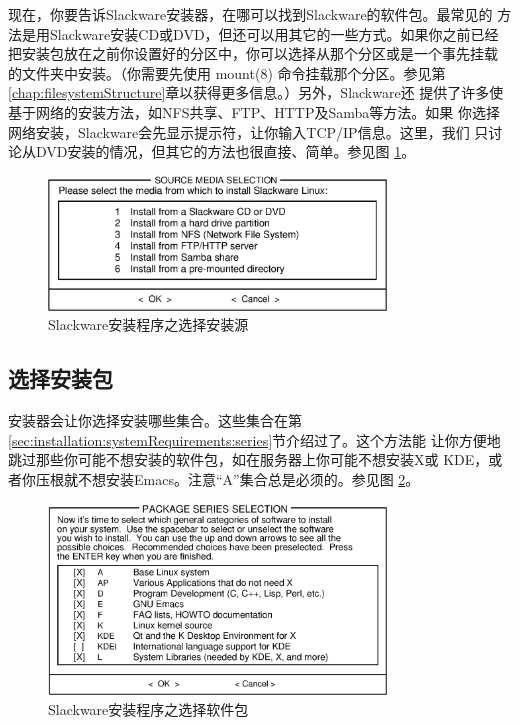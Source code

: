 现在，你要告诉Slackware安装器，在哪可以找到Slackware的软件包。最常见的
方法是用Slackware安装CD或DVD，但还可以用其它的一些方式。如果你之前已经
把安装包放在之前你设置好的分区中，你可以选择从那个分区或是一个事先挂载
的文件夹中安装。（你需要先使用 mount(8) 命令挂载那个分区。参见第
\ref{chap:filesystemStructure}章以获得更多信息。）另外，Slackware还
提供了许多使基于网络的安装方法，如NFS共享、FTP、HTTP及Samba等方法。如果
你选择网络安装，Slackware会先显示提示符，让你输入TCP/IP信息。这里，我们
只讨论从DVD安装的情况，但其它的方法也很直接、简单。参见图
\ref{fig:setup-source}。
\begin{figure}[htbf]
  \centering
  \includegraphics[width=0.8\textwidth]{images/installation/setup-source.eps}
  \caption{Slackware安装程序之选择安装源}
  \label{fig:setup-source}
\end{figure}

\subsection{选择安装包}
\label{sec:installation:setup:select}

安装器会让你选择安装哪些集合。这些集合在第
\ref{sec:installation:systemRequirements:series}节介绍过了。这个方法能
让你方便地跳过那些你可能不想安装的软件包，如在服务器上你可能不想安装X或
KDE，或者你压根就不想安装Emacs。注意``A''集合总是必须的。参见图
\ref{fig:setup-select}。
\begin{figure}[htbf]
  \centering
  \includegraphics[width=0.8\textwidth]{images/installation/setup-select.eps}
  \caption{Slackware安装程序之选择软件包}
  \label{fig:setup-select}
\end{figure}

